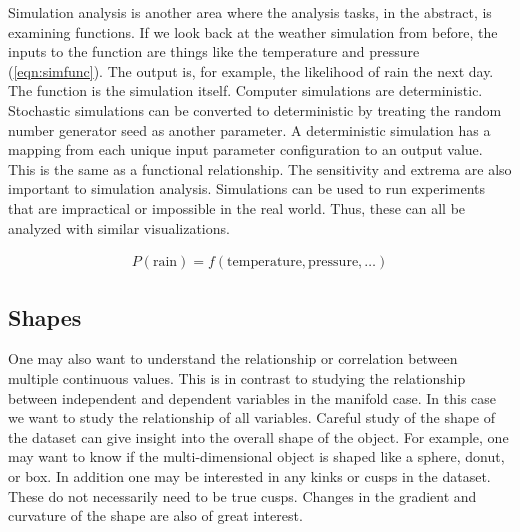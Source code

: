 Simulation analysis is another area where the analysis tasks, in the abstract,
is examining functions. If we look back at the weather simulation from before,
the inputs to the function are things like the temperature and pressure
(\autoref{eqn:simfunc}). The output is, for example, the likelihood of rain the
next day. The function is the simulation itself. Computer simulations are
deterministic. Stochastic simulations can be converted to deterministic by
treating the random number generator seed as another parameter.  A
deterministic simulation has a mapping from each unique input parameter
configuration to an output value. This is the same as a functional
relationship. The sensitivity and extrema are also important to simulation
analysis. Simulations can be used to run experiments that are impractical or
impossible in the real world. Thus, these can all be analyzed with similar
visualizations.

\begin{eqnarray}
  P(\textrm{rain}) = f(\textrm{temperature}, \textrm{pressure}, \ldots)
  \label{eqn:simfunc}
\end{eqnarray}

\subsection{Shapes}
\label{sec:shapes}

One may also want to understand the relationship or correlation between
multiple continuous values. This is in contrast to studying the relationship
between independent and dependent variables in the manifold case. In this case
we want to study the relationship of all variables. Careful study of the shape
of the dataset can give insight into the overall shape of the object. For
example, one may want to know if the multi-dimensional object is shaped like a
sphere, donut, or box.
In addition one may be interested in any kinks or cusps in the dataset.
 These do not necessarily need to be true cusps. Changes in
the gradient and curvature of the shape are also of great interest.

